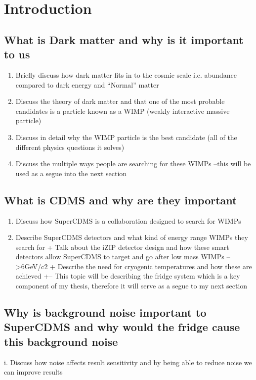\section{Introduction}
\subsection{What is Dark matter and why is it important to us}

\begin{enumerate}
    \item Briefly discuss how dark matter fits in to the cosmic scale i.e. abundance compared to dark energy and “Normal” matter
    \item Discuss the theory of dark matter and that one of the most probable candidates is a particle known as a WIMP (weakly interactive massive particle)
    \item Discuss in detail why the WIMP particle is the best candidate (all of the different physics questions it solves)
    \item Discuss the multiple ways people are searching for these WIMPs –this will be used as a segue into the next section
\end{enumerate}

\subsection{What is CDMS and why are they important}

\begin{enumerate}
    \item Discuss how SuperCDMS is a collaboration designed to search for WIMPs
    \item Describe SuperCDMS detectors and what kind of energy range WIMPs they search for 
        + Talk about the iZIP detector design and how these smart detectors allow SuperCDMS to target and go after low mass WIMPs –   >6GeV/c2
        + Describe the need for cryogenic temperatures and how these are achieved
        +--	This topic will be describing the fridge system which is a key component of my thesis, therefore it will serve as a segue to my next section 
\end{enumerate}

\subsection{	Why is background noise important to SuperCDMS and why would the fridge cause this background noise}
\cite{pyle2012}
i.	Discuss how noise affects result sensitivity and by being able to reduce noise we can improve results 

